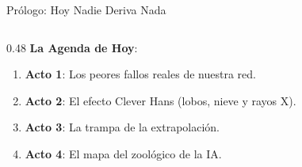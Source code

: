 \documentclass[10pt,aspectratio=169]{beamer}
\begin{document}
\begin{frame}{Prólogo: Hoy Nadie Deriva Nada}
\begin{columns}[T]
\begin{column}{0.48\textwidth}
      \vspace{0.1cm}
      \textbf{La Agenda de Hoy}:
      \begin{enumerate}\scriptsize
        \item \textbf{Acto 1}: Los peores fallos reales de nuestra red.
        \item \textbf{Acto 2}: El efecto Clever Hans (lobos, nieve y rayos X).
        \item \textbf{Acto 3}: La trampa de la extrapolación.
        \item \textbf{Acto 4}: El mapa del zoológico de la IA.
      \end{enumerate}
    \end{column}
  \end{columns}
\end{frame}
\end{document}

